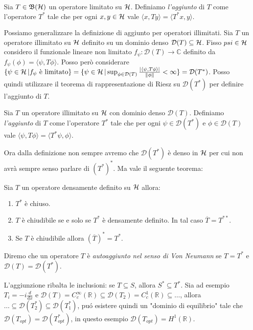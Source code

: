 \begin{definition}
    Sia $T \in \operatorname{\mathfrak{B}(\mathcal{H})}$ un operatore limitato su $\operatorname{\mathcal{H}}$. Definiamo \emph{l'aggiunto} di $T$ come l'operatore $T^*$ tale che per ogni $x, y \in \operatorname{\mathcal{H}}$ vale $\langle  x, Ty \rangle = \langle T^* x,  y \rangle$.
\end{definition}

Possiamo generalizzare la definizione di aggiunto per operatori illimitati. Sia $T$ un operatore illimitato su $\operatorname{\mathcal{H}}$ definito su un dominio denso $\mathcal{D}(T) \subseteq \operatorname{\mathcal{H}}$. Fisso $psi \in \operatorname{\mathcal{H}}$ considero il funzionale lineare non limitato $f_\psi : \mathcal{D}(T) \to \mathbb{C}$ definito da $f_\psi(\phi) = \langle \psi, T \phi \rangle$. Posso però considerare $\{ \psi \in \operatorname{\mathcal{H}} | f_\psi \text{ è limitato} \} = \{ \psi \in \operatorname{\mathcal{H}} | \sup_{\phi \in \mathcal{D}(T)} \frac{|\langle \psi, T \phi \rangle|}{\| \phi \|} < \infty \} = \mathcal{D}(T^*)$. 
Posso quindi utilizzare il teorema di rappresentazione di Riesz su $\mathcal{D}(T^*)$ per definire l'aggiunto di $T$.

\begin{definition}
    Sia $T$ un operatore illimitato su $\operatorname{\mathcal{H}}$ con dominio denso $\mathcal{D}(T)$. Definiamo \emph{l'aggiunto} di $T$ come l'operatore $T^*$ tale che per ogni $\psi \in \mathcal{D}(T^*)$ e $\phi \in \mathcal{D}(T)$ vale $\langle  \psi, T\phi \rangle = \langle T^* \psi,  \phi \rangle$.
\end{definition}

Ora dalla definizione non sempre avremo che $\mathcal{D}(T^*)$ è denso in $\operatorname{\mathcal{H}}$ per cui non avrà sempre senso parlare di $(T^*)^*$. Ma vale il seguente teorema:

\begin{theorem}
    Sia $T$ un operatore densamente definito su $\operatorname{\mathcal{H}}$ allora: 
\begin{enumerate}
    \item $T^*$ è chiuso.
    \item $T$ è chiudibile se e solo se $T^*$ è densamente definito. In tal caso $\overline{T} = T^{**}$.
    \item Se $T$ è chiudibile allora $(\overline{T})^* = T^*$.
\end{enumerate}
\end{theorem}

\begin{definition}
    Diremo che un operatore $T$ è \emph{autoaggiunto nel senso di Von Neumann} se $T = T^*$ e $\mathcal{D}(T) = \mathcal{D}(T^*)$.
\end{definition}

\begin{observation}
L'aggiunzione ribalta le inclusioni: se $T \subseteq S$, allora $S^* \subseteq T^*$. Sia ad esempio $T_i = -i \frac{d}{dx}$ e $\mathcal{D}(T) = C_c^\infty(\mathbb{R})\subseteq \mathcal{D}(T_2) = C_c^1(\mathbb{R} ) \subseteq \dots $, allora $\dots \subseteq \mathcal{D}(T^*_2) \subseteq \mathcal{D}(T^*_1)$, puó esistere quindi un "dominio di equilibrio" tale che $\mathcal{D}(T_{opt})=\mathcal{D}(T^*_{opt})$, in questo esempio $\mathcal{D}(T_{opt}) = H^1(\mathbb{R})$.
\end{observation}   


